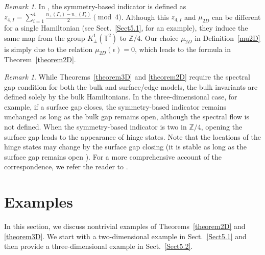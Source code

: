 \documentclass{amsart}
\theoremstyle{plain}
\theoremstyle{definition}
\theoremstyle{remark}
\newtheorem{remark}[theorem]{Remark}
\newcommand{\Z}{\mathbb{Z}}
\newcommand{\T}{\mathbb{T}}
\begin{document}
\begin{remark}
In \cite[Appendix B]{SO21}, the symmetry-based indicator is defined as
$z_{4,I} = \sum_{i=1}^4\frac{n_+(\Gamma_i) - n_-(\Gamma_i)}{2} \pmod4$.
Although this $z_{4,I}$ and $\mu_{2D}$ can be different for a single Hamiltonian (see Sect.~\ref{Sect5.1}, for an example), they induce the same map from the group $K^1_\pm(\T^2)$ to $\Z/4$.
Our choice $\mu_{2D}$ in Definition~\ref{mu2D} is simply due to the relation $\mu_{2D}(\epsilon) = 0$, which leads to the formula in Theorem~\ref{theorem2D}.
\end{remark}

\begin{remark}
\label{rem4.6}
While Theorems~\ref{theorem3D} and \ref{theorem2D} require the spectral gap condition for both the bulk and surface/edge models, the bulk invariants are defined solely by the bulk Hamiltonians.
In the three-dimensional case, for example, if a surface gap closes, the symmetry-based indicator remains unchanged as long as the bulk gap remains open, although the spectral flow is not defined.
When the symmetry-based indicator is two in $\Z/4$, opening the surface gap leads to the appearance of hinge states.
Note that the locations of the hinge states may change by the surface gap closing (it is stable as long as the surface gap remains open \cite{Hayashi2}).
For a more comprehensive account of the correspondence, we refer the reader to \cite{OPS24a}.
\end{remark}

\section{Examples}
\label{Sect5}
In this section, we discuss nontrivial examples of Theorems~\ref{theorem2D} and \ref{theorem3D}.
We start with a two-dimensional example in Sect.~\ref{Sect5.1} and then provide a three-dimensional example in Sect.~\ref{Sect5.2}.

\end{document}
